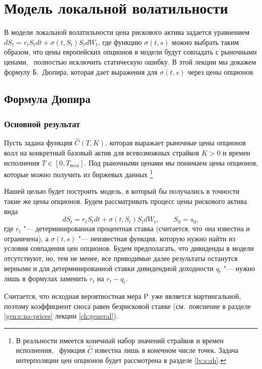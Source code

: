 
\chapter{Модель локальной волатильности}
\label{ch:locvol}
\chaptertoc

В модели локальной волатильности цена рискового актива задается уравнением $d S_t = r_tS_tdt + \sigma(t,S_t) S_t d W_t$, где функцию $\sigma(t,s)$ можно выбрать таким образом, что цены европейских опционов в модели будут совпадать с рыночными ценами, \te\ полностью исключить статическую ошибку.
В этой лекции мы докажем формулу Б.~Дюпира, которая дает выражения для $\sigma(t,s)$ через цены опционов.

\section{Формула Дюпира}
\subsection{Основной результат}

Пусть задана функция $\hat C(T,K)$, которая выражает рыночные цены опционов колл на конкретный базовый актив для всевозможных страйков $K>0$ и времен исполнения $T\in[0,T_{\max}]$.
Под рыночными ценами мы понимаем цены опционов, которые можно получить из биржевых данных%
\footnote{В реальности имеется конечный набор значений страйков и времен исполнения, \te\ функция $\hat C$ известна лишь в конечном числе точек.
Задача интерполяции цен опционов будет рассмотрена в разделе \ref{lv:s:ah}.}

Нашей целью будет построить модель, в который бы получались в точности такие же цены опционов.
Будем рассматривать процесс цены рискового актива вида
\begin{equation}
\label{lv:model}
d S_t = r_tS_t dt + \sigma(t,S_t) S_t d W_t, \qquad S_0=s_0,
\end{equation}
где $r_t$ "--- детерминированная процентная ставка (считается, что она известна и ограничена), а $\sigma(t,s)$ "--- неизвестная функция, которую нужно найти из условия совпадения цен опционов. 
Будем предполагать, что дивиденды в модели отсутствуют, но, тем не менее, все приводимые далее результаты останутся верными и для детерминированной ставки дивидендной доходности $q_t$ "--- нужно лишь в формулах заменить $r_t$ на $r_t-q_t$.

Считается, что исходная вероятностная мера $\P$ уже является мартингальной, поэтому коэффициент сноса равен безрисковой ставке (см.\ пояснение в разделе \ref{gen:s:na-prices} лекции \ref{ch:general}).

